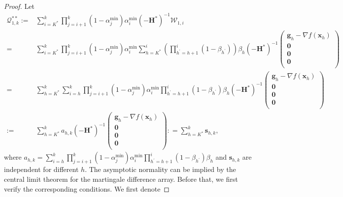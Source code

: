 \documentclass[aos]{imsart}
\numberwithin{equation}{section}
\theoremstyle{plain}
\begin{document}
\begin{appendix}
\begin{proof}
    Let 
    \begin{equation}
        \begin{split}
            \mathcal{Q}_{1,k}^{**}  := & \sum_{i=K^{*}}^{k} \prod_{j=i+1}^{k} (1-\alpha^{\min}_j) \alpha^{\min}_i \left(-\bm{H}^{*}\right)^{-1} \mathcal{W}_{1,i} \\
            = & \sum_{i=K^{*}}^{k} \prod_{j=i+1}^{k} (1-\alpha^{\min}_j) \alpha^{\min}_i  \sum_{h=K^{*}}^{i} \left( \prod_{h^{\prime}=h+1}^{i} (1-\beta_{h^{\prime}}) \right) \beta_h \left(-\bm{H}^{*}\right)^{-1}  \left( \begin{array}{c}
                \bm{g}_{h} - \nabla f(\bm{x}_h) \\
                \bm{0}\\
                \bm{0}\\
                \bm{0}\\
            \end{array}\right) \\
            = & \sum_{h=K^{*}}^{k} \sum_{i = h}^{k}  \prod_{j=i+1}^{k} \left(1-\alpha^{\min}_j \right) \alpha^{\min}_{i} \prod_{h^{\prime}=h+1}^{i} (1-\beta_{h^{\prime}}) \beta_{h} \left(-\bm{H}^{*}\right)^{-1}  \left( \begin{array}{c}
                \bm{g}_{h} - \nabla f(\bm{x}_h) \\
                \bm{0}\\
                \bm{0}\\
                \bm{0}\\
            \end{array}\right)\\
            := &  \sum_{h=K^{*}}^{k}  a_{h,k} \left(-\bm{H}^{*}\right)^{-1} \left( \begin{array}{c}
                \bm{g}_{h} - \nabla f(\bm{x}_h) \\
                \bm{0}\\
                \bm{0}\\
                \bm{0}\\
            \end{array}\right) : = \sum_{h=K^{*}}^{k} \bm{s}_{h,k},
        \end{split}
    \end{equation}
    where $ a_{h,k} = \sum_{i = h}^{k}  \prod_{j=i+1}^{k} \left(1-\alpha^{\min}_j \right) \alpha^{\min}_{i} \prod_{h^{\prime}=h+1}^{i} (1-\beta_{h^{\prime}}) \beta_{h}$ and $\bm{s}_{h,k}$ are independent for different $h$. The asymptotic normality can be implied by the central limit theorem for the martingale difference array. Before that, we first  verify the corresponding conditions. We first denote 

\end{proof}
\end{appendix}
\end{document}
